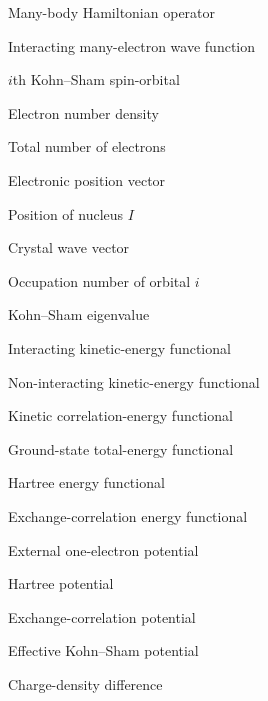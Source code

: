 \clearpage
{}

\begin{thesisfrontmatterentries}
  \item[\(\hat{H}\)] Many-body Hamiltonian operator
  \item[\(\Psi\)] Interacting many-electron wave function
  \item[\(\psi_i(\vec{r}\,)\)] \(i\)th Kohn--Sham spin-orbital
  \item[\(n(\vec{r}\,)\)] Electron number density
  \item[\(N\)] Total number of electrons
  \item[\(\vec{r}\)] Electronic position vector
  \item[\(\vec{R}_I\)] Position of nucleus \(I\)
  \item[\(\vec{k}\)] Crystal wave vector
  \item[\(f_i\)] Occupation number of orbital \(i\)
  \item[\(\lambda_i\)] Kohn--Sham eigenvalue
  \item[{\(K[n]\)}] Interacting kinetic-energy functional
  \item[{\(K_\mathrm{s}[n]\)}] Non-interacting kinetic-energy functional
  \item[{\(K_\mathrm{c}[n]\)}] Kinetic correlation-energy functional
  \item[{\(E[n]\)}] Ground-state total-energy functional
  \item[{\(E_{\mathrm{H}}[n]\)}] Hartree energy functional
  \item[{\(E_{\mathrm{xc}}[n]\)}] Exchange-correlation energy functional
  \item[\(v_{\mathrm{ext}}(\vec{r}\,)\)] External one-electron potential
  \item[{\(v_{\mathrm{H}}([n];\vec{r}\,)\)}] Hartree potential
  \item[{\(v_{\mathrm{xc}}([n];\vec{r}\,)\)}] Exchange-correlation potential
  \item[{\(v_{\mathrm{eff}}([n];\vec{r}\,)\)}] Effective Kohn--Sham potential
  \item[\(\Delta\rho(\vec{r}\,)\)] Charge-density difference
\end{thesisfrontmatterentries}


